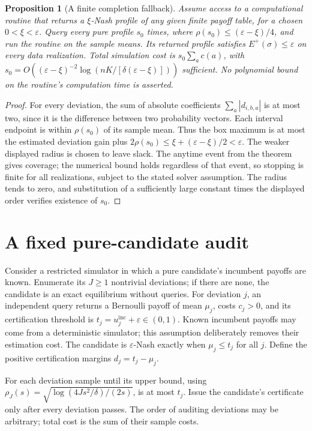 \documentclass[11pt]{article}
\newtheorem{proposition}[theorem]{Proposition}
\theoremstyle{remark}\newtheorem{remark}[theorem]{Remark}
\begin{document}
\begin{proposition}[A finite completion fallback]
Assume access to a computational routine that returns a $\xi$-Nash profile of any given finite payoff table, for a chosen $0<\xi<\varepsilon$. Query every pure profile $s_0$ times, where $\rho(s_0)\le(\varepsilon-\xi)/4$, and run the routine on the sample means. Its returned profile satisfies $E^+(\sigma)\le\varepsilon$ on every data realization. Total simulation cost is $s_0\sum_a c(a)$, with
$s_0=O((\varepsilon-\xi)^{-2}\log(nK/[\delta(\varepsilon-\xi)]))$ sufficient. No polynomial bound on the routine's computation time is asserted.
\end{proposition}
\begin{proof}
For every deviation, the sum of absolute coefficients $\sum_a|d_{i,b,a}|$ is at most two, since it is the difference between two probability vectors. Each interval endpoint is within $\rho(s_0)$ of its sample mean. Thus the box maximum is at most the estimated deviation gain plus $2\rho(s_0)\le\xi+(\varepsilon-\xi)/2<\varepsilon$. The weaker displayed radius is chosen to leave slack. The anytime event from the theorem gives coverage; the numerical bound holds regardless of that event, so stopping is finite for all realizations, subject to the stated solver assumption. The radius tends to zero, and substitution of a sufficiently large constant times the displayed order verifies existence of $s_0$.
\end{proof}

\section*{A fixed pure-candidate audit}
Consider a restricted simulator in which a pure candidate's incumbent payoffs are known. Enumerate its $J\ge1$ nontrivial deviations; if there are none, the candidate is an exact equilibrium without queries. For deviation $j$, an independent query returns a Bernoulli payoff of mean $\mu_j$, costs $c_j>0$, and its certification threshold is $t_j=u_j^{\mathrm{inc}}+\varepsilon\in(0,1)$. Known incumbent payoffs may come from a deterministic simulator; this assumption deliberately removes their estimation cost. The candidate is $\varepsilon$-Nash exactly when $\mu_j\le t_j$ for all $j$. Define the positive certification margins $d_j=t_j-\mu_j$.

For each deviation sample until its upper bound, using
$\rho_J(s)=\sqrt{\log(4Js^2/\delta)/(2s)}$, is at most $t_j$. Issue the candidate's certificate only after every deviation passes. The order of auditing deviations may be arbitrary; total cost is the sum of their sample costs.
\end{document}
